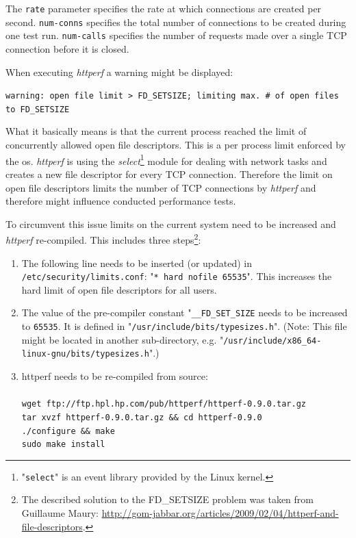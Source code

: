 The \texttt{rate} parameter specifies the rate at which connections are created per second. \texttt{num-conns} specifies the total number of connections to be created during one test run. \texttt{num-calls} specifies the number of requests made over a single TCP connection before it is closed.

When executing \textit{httperf} a warning might be displayed:

\texttt{warning: open file limit > FD\_SETSIZE; limiting max. \# of open files to FD\_SETSIZE}

What it basically means is that the current process reached the limit of concurrently allowed open file descriptors. This is a per process limit enforced by the \gls{os}. \textit{httperf} is using the \textit{select}\footnote{"\texttt{select}" is an event library provided by the Linux kernel.} module for dealing with network tasks and creates a new file descriptor for every TCP connection. Therefore the limit on open file descriptors limits the number of TCP connections by \textit{httperf} and therefore might influence conducted performance tests.

To circumvent this issue limits on the current system need to be increased and \textit{httperf} re-compiled. This includes three steps\footnote{The described solution to the FD\_SETSIZE problem was taken from Guillaume Maury: \url{http://gom-jabbar.org/articles/2009/02/04/httperf-and-file-descriptors}.}:

\begin{enumerate}
\item The following line needs to be inserted (or updated) in \texttt{/etc/security/limits.conf}: "\texttt{* hard nofile 65535}". This increases the hard limit of open file descriptors for all users.

\item The value of the pre-compiler constant "\texttt{\_\_FD\_SET\_SIZE} needs to be increased to \texttt{65535}. It is defined in "\texttt{/usr/include/bits/typesizes.h}". (Note: This file might be located in another sub-directory, e.g. "\texttt{/usr/include/x86\_64-linux-gnu/bits/typesizes.h}".)

\item httperf needs to be re-compiled from source:\\
 \\
\texttt{wget ftp://ftp.hpl.hp.com/pub/httperf/httperf-0.9.0.tar.gz\\
tar xvzf httperf-0.9.0.tar.gz \&\& cd httperf-0.9.0\\
./configure \&\& make\\
sudo make install}
\end{enumerate}

